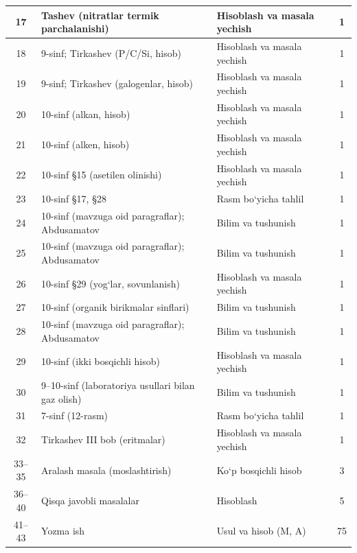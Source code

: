 \documentclass[11pt,a4paper]{article}
\begin{document}
{\begin{longtable}{|c|p{7.2cm}|p{5.4cm}|c|}
17 & Tashev (nitratlar termik parchalanishi) & Hisoblash va masala yechish & 1\\\hline
18 & 9-sinf; Tirkashev (P/C/Si, hisob) & Hisoblash va masala yechish & 1\\\hline
19 & 9-sinf; Tirkashev (galogenlar, hisob) & Hisoblash va masala yechish & 1\\\hline
20 & 10-sinf (alkan, hisob) & Hisoblash va masala yechish & 1\\\hline
21 & 10-sinf (alken, hisob) & Hisoblash va masala yechish & 1\\\hline
22 & 10-sinf \S{}15 (asetilen olinishi) & Hisoblash va masala yechish & 1\\\hline
23 & 10-sinf \S{}17, \S{}28 & Rasm bo`yicha tahlil & 1\\\hline
24 & 10-sinf (mavzuga oid paragraflar); Abdusamatov & Bilim va tushunish & 1\\\hline
25 & 10-sinf (mavzuga oid paragraflar); Abdusamatov & Bilim va tushunish & 1\\\hline
26 & 10-sinf \S{}29 (yog`lar, sovunlanish) & Hisoblash va masala yechish & 1\\\hline
27 & 10-sinf (organik birikmalar sinflari) & Bilim va tushunish & 1\\\hline
28 & 10-sinf (mavzuga oid paragraflar); Abdusamatov & Bilim va tushunish & 1\\\hline
29 & 10-sinf (ikki bosqichli hisob) & Hisoblash va masala yechish & 1\\\hline
30 & 9--10-sinf (laboratoriya usullari bilan gaz olish) & Bilim va tushunish & 1\\\hline
31 & 7-sinf (12-rasm) & Rasm bo`yicha tahlil & 1\\\hline
32 & Tirkashev III bob (eritmalar) & Hisoblash va masala yechish & 1\\\hline
33--35 & Aralash masala (moslashtirish) & Ko`p bosqichli hisob & 3\\\hline
36--40 & Qisqa javobli masalalar & Hisoblash & 5\\\hline
41--43 & Yozma ish & Usul va hisob (M, A) & 75\\\hline
\end{longtable}}
\end{document}
